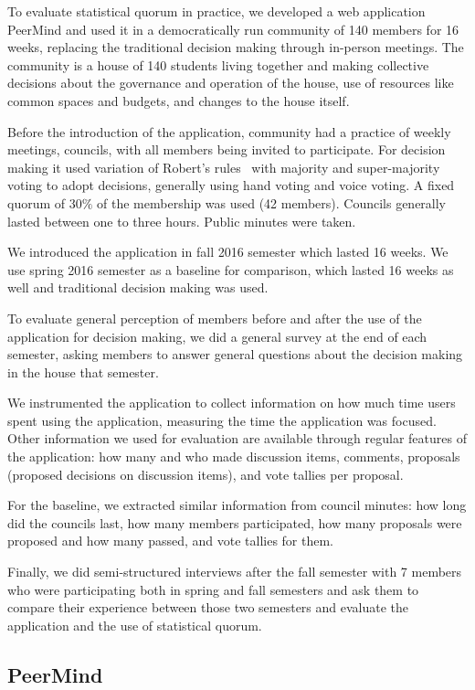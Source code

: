 \documentclass[format=acmsmall, review=true, screen=true, anonymous=true]{acmart}
\begin{document}
To evaluate statistical quorum in practice, we developed a web application PeerMind and
used it in a democratically run community of 140 members for 16 weeks, replacing the traditional
decision making through in-person meetings. The community is a house of 140
students living together and making collective decisions about the governance and operation of
the house, use of resources like common spaces and budgets, and changes to the house itself.

Before the introduction of the application, community had a practice of weekly meetings, councils, with all
members being invited to participate. For decision making it used variation of Robert's rules~\cite{roberts}
with majority and super-majority voting to adopt decisions, generally using hand voting and voice voting.
A fixed quorum of $30\%$ of the membership was used (42 members). Councils generally lasted between one to three hours.
Public minutes were taken.

We introduced the application in fall 2016 semester which lasted 16 weeks. We use spring 2016 semester as
a baseline for comparison, which lasted 16 weeks as well and traditional decision making was used.

To evaluate general perception of members before and after the use of the application for decision making,
we did a general survey at the end of each semester, asking members to answer general questions about the
decision making in the house that semester.

We instrumented the application to collect information on how much time users spent using the application,
measuring the time the application was focused. Other information we used for evaluation are available
through regular features of the application: how many and who made discussion items, comments, proposals
(proposed decisions on discussion items), and vote tallies per proposal.

For the baseline, we extracted similar information from council minutes: how long did the councils last,
how many members participated, how many proposals were proposed and how many passed, and vote tallies for them.

Finally, we did semi-structured interviews after the fall semester with 7 members who were participating
both in spring and fall semesters and ask them to compare their experience between those two semesters and
evaluate the application and the use of statistical quorum.

\subsection{PeerMind}
\label{sec:peermind}
\end{document}
